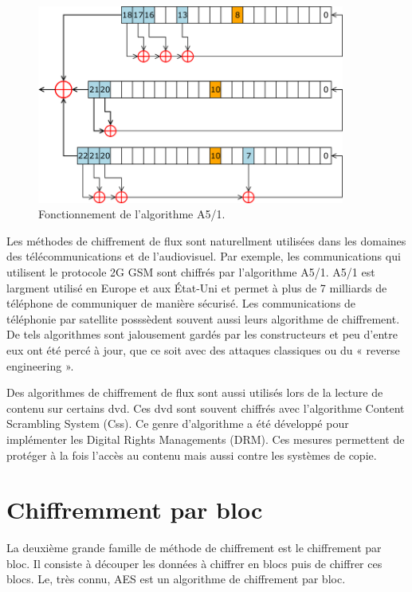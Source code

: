 	\begin{figure}[!h]
		\centering
		\includegraphics[width=0.9\textwidth]{imgs/application/A5.png}
		\caption{Fonctionnement de l'algorithme A5/1.}
		\label{algoA5}
	\end{figure}

	Les méthodes de chiffrement de flux sont naturellment utilisées dans les
	domaines des télécommunications et de l'audiovisuel. Par exemple, les
	communications qui utilisent le protocole 2G GSM sont chiffrés par
	l'algorithme A5/1. A5/1 est largment utilisé en Europe et aux État-Uni et
	permet à plus de 7 milliards de téléphone de communiquer de manière
	sécurisé\cite{7milliards}. Les communications de téléphonie par satellite
	posssèdent souvent aussi leurs algorithme de chiffrement. De tels algorithmes
	sont jalousement gardés par les constructeurs et peu d'entre eux ont été percé à
	jour, que ce soit avec des attaques classiques ou du « reverse engineering ».

	Des algorithmes de chiffrement de flux sont aussi utilisés lors de la lecture
	de contenu sur certains dvd. Ces dvd sont souvent chiffrés avec l'algorithme
	Content Scrambling System (Css). Ce genre d'algorithme a été développé pour
	implémenter les Digital Rights Managements (DRM). Ces mesures permettent de
	protéger à la fois l'accès au contenu mais aussi contre les systèmes de copie.
	\section{Chiffremment par bloc}

	La deuxième grande famille de méthode de chiffrement est le chiffrement par
	bloc. Il consiste à découper les données à chiffrer en blocs puis de chiffrer
	ces blocs. Le, très connu, AES est un algorithme de chiffrement par bloc.

